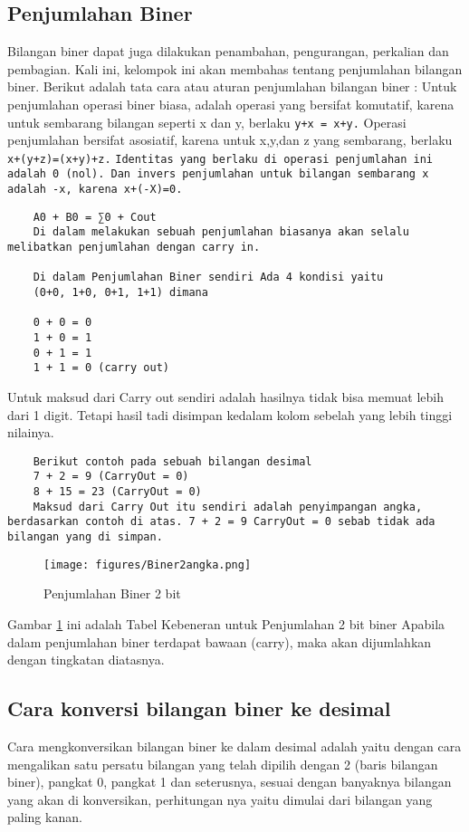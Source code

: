 \subsection {Penjumlahan Biner}
Bilangan biner dapat juga dilakukan penambahan, pengurangan, perkalian dan pembagian. Kali ini, kelompok ini akan membahas tentang penjumlahan bilangan biner. Berikut adalah tata cara atau aturan penjumlahan bilangan biner :
Untuk penjumlahan operasi biner biasa, adalah operasi yang bersifat komutatif, karena untuk sembarang bilangan seperti x dan y, berlaku \verb|y+x = x+y.| Operasi penjumlahan bersifat asosiatif\cite{brent1970addition}, karena untuk x,y,dan z yang sembarang, berlaku \verb|x+(y+z)=(x+y)+z.| \verb|Identitas yang berlaku di operasi penjumlahan ini adalah 0 (nol). Dan invers penjumlahan untuk bilangan sembarang x adalah -x, karena x+(-X)=0.|
\begin{verbatim}
	A0 + B0 = ∑0 + Cout
	Di dalam melakukan sebuah penjumlahan biasanya akan selalu melibatkan penjumlahan dengan carry in.

	Di dalam Penjumlahan Biner sendiri Ada 4 kondisi yaitu
	(0+0, 1+0, 0+1, 1+1) dimana

	0 + 0 = 0
	1 + 0 = 1
	0 + 1 = 1
	1 + 1 = 0 (carry out) 
\end{verbatim}
	Untuk maksud dari Carry out sendiri adalah hasilnya tidak bisa memuat lebih dari 1 digit. Tetapi  hasil tadi disimpan kedalam kolom sebelah yang lebih tinggi nilainya.
\begin{verbatim}
	Berikut contoh pada sebuah bilangan desimal
	7 + 2 = 9 (CarryOut = 0)
	8 + 15 = 23 (CarryOut = 0)
	Maksud dari Carry Out itu sendiri adalah penyimpangan angka, berdasarkan contoh di atas. 7 + 2 = 9 CarryOut = 0 sebab tidak ada bilangan yang di simpan. 
\end{verbatim}

		\begin{figure} [ht]
		\centerline{\texttt{[image: figures/Biner2angka.png]}}
		\caption{Penjumlahan Biner 2 bit}
		\label{Biner2angka}
		\end{figure}
	Gambar \ref{Biner2angka} ini adalah Tabel Kebeneran untuk Penjumlahan 2 bit biner
	Apabila dalam penjumlahan biner terdapat bawaan (carry), maka akan dijumlahkan dengan tingkatan diatasnya.

\subsection {Cara konversi bilangan biner ke desimal}
Cara mengkonversikan bilangan biner ke dalam desimal adalah yaitu dengan cara mengalikan satu persatu bilangan yang telah dipilih dengan 2 (baris bilangan biner), pangkat 0, pangkat 1 dan seterusnya, sesuai dengan banyaknya bilangan yang akan di konversikan, perhitungan nya yaitu dimulai dari bilangan yang paling kanan\cite{wang201140}.

